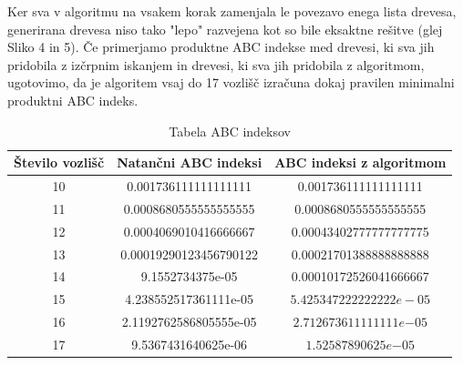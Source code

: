 \documentclass[a4paper,12 pt]{article}
\begin{document}
Ker sva v algoritmu na vsakem korak zamenjala le povezavo enega lista drevesa, generirana drevesa niso tako "lepo" razvejena kot so bile eksaktne rešitve (glej Sliko 4 in 5). Če primerjamo produktne ABC indekse med drevesi, ki sva jih pridobila z izčrpnim iskanjem in drevesi, ki sva jih pridobila z algoritmom, ugotovimo, da je algoritem vsaj do 17 vozlišč izračuna dokaj pravilen minimalni produktni ABC indeks.


\begin{table}
 \begin{tabular}{||c  c c||} 
 \hline
 Število vozlišč & Natančni ABC indeksi & ABC indeksi z algoritmom \\ [0.5ex] 
 \hline\hline
 10 & 0.001736111111111111 & 0.001736111111111111\\ 
 \hline
 11 & 0.0008680555555555555 & 0.0008680555555555555 \\
 \hline
 12 & 0.0004069010416666667 & 0.00043402777777777775 \\
 \hline
 13 & 0.00019290123456790122 & 0.00021701388888888888 \\
 \hline
 14 & 9.1552734375e{-05} & 0.00010172526041666667 \\ 
 \hline
 15 & 4.238552517361111e{-05} & $5.425347222222222{e-05}$ \\
 \hline
 16& 2.1192762586805555e{-05} & $2.712673611111111e{-05}$    \\
 \hline
 17  & 9.5367431640625e{-06} & $1.52587890625e{-05}$\\ [1ex] 
 \hline
\end{tabular}
\caption{Tabela ABC indeksov}
\label{table:1}
\end{table}
\end{document}
